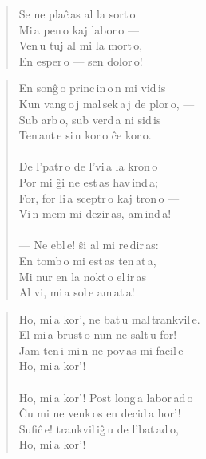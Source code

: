 {\begin{verse}
        Se ne plaĉ\,as al la sort\,o\\
        Mi\,a pen\,o kaj labor\,o ---\\
        Ven\,u tuj al mi la mort\,o,\\
        En esper\,o --- sen dolor\,o!
\end{verse}
\begin{verse}
        \vin En sonĝ\,o princ\,in\,o\,n mi vid\,is\\
        Kun vang\,o\,j mal\,sek\,a\,j de plor\,o, ---\\
        Sub arb\,o, sub verd\,a ni sid\,is\\
        Ten\,ant\,e si\,n kor\,o ĉe kor\,o.\\
\pstars\\
        \vin \glqq{}De l’patr\,o de l’vi\,a la kron\,o\\
        Por mi ĝi ne est\,as hav\,ind\,a;\\
        For, for li\,a sceptr\,o kaj tron\,o ---\\
        Vi\,n mem mi dezir\,as, am\,ind\,a!\grqq{}\\
\pstars\\
        \vin --- \glqq{}Ne ebl\,e!\grqq{} ŝi al mi re\,dir\,as:\\
        \glqq{}En tomb\,o mi est\,as ten\,at\,a,\\
        Mi nur en la nokt\,o el\,ir\,as\\
        Al vi, mi\,a sol\,e am\,at\,a!\grqq{}\\
\end{verse}


\begin{verse}
\vin Ho, mi\,a kor’, ne bat\,u mal\,trankvil\,e. \\
El mi\,a brust\,o nun ne salt\,u for! \\
Jam ten\,i mi\,n ne pov\,as mi facil\,e \\
Ho, mi\,a kor’! \\
\pstars\\
\vin Ho, mi\,a kor’! Post long\,a labor\,ad\,o \\
Ĉu mi ne venk\,os en decid\,a hor’! \\
Sufiĉ\,e! trankvil\,iĝ\,u de l’bat\,ad\,o, \\
Ho, mi\,a kor’! 
\end{verse}
}
\sectionline
